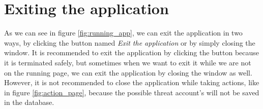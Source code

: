 \section{Exiting the application}
As we can see in figure \ref{fig:running_app}, we can exit the application in two ways, by clicking the button named \textit{Exit the application} or by simply closing the window. It is recommended to exit the application by clicking the button because it is terminated safely, but sometimes when we want to exit it while we are not on the running page, we can exit the application by closing the window as well. However, it is not recommended to close the application while taking actions, like in figure \ref{fig:action_page}, because the possible threat account's will not be saved in the database.




